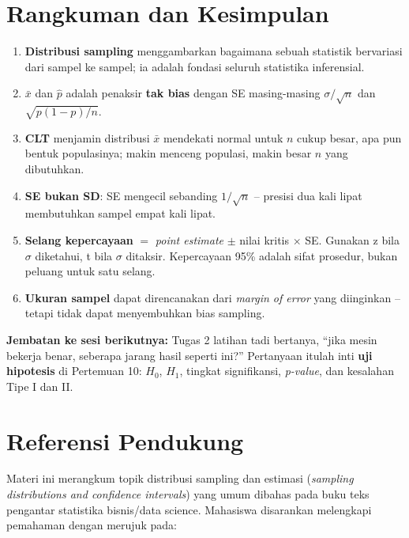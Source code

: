 \documentclass[
  indonesian,
  letterpaper,
]{book}
\providecommand{\tightlist}{%
  \setlength{\itemsep}{0pt}\setlength{\parskip}{0pt}}
\begin{document}

\chapter{Rangkuman dan Kesimpulan}\label{rangkuman-dan-kesimpulan}

\begin{enumerate}
\def\labelenumi{\arabic{enumi}.}
\tightlist
\item
  \textbf{Distribusi sampling} menggambarkan bagaimana sebuah statistik
  bervariasi dari sampel ke sampel; ia adalah fondasi seluruh statistika
  inferensial.
\item
  \(\bar{x}\) dan \(\hat{p}\) adalah penaksir \textbf{tak bias} dengan
  SE masing-masing \(\sigma/\sqrt{n}\) dan \(\sqrt{p(1 - p)/n}\).
\item
  \textbf{CLT} menjamin distribusi \(\bar{x}\) mendekati normal untuk
  \(n\) cukup besar, apa pun bentuk populasinya; makin menceng populasi,
  makin besar \(n\) yang dibutuhkan.
\item
  \textbf{SE bukan SD}: SE mengecil sebanding \(1/\sqrt{n}\) -- presisi
  dua kali lipat membutuhkan sampel empat kali lipat.
\item
  \textbf{Selang kepercayaan} \(=\) \emph{point estimate} \(\pm\) nilai
  kritis \(\times\) SE. Gunakan z bila \(\sigma\) diketahui, t bila
  \(\sigma\) ditaksir. Kepercayaan 95\% adalah sifat prosedur, bukan
  peluang untuk satu selang.
\item
  \textbf{Ukuran sampel} dapat direncanakan dari \emph{margin of error}
  yang diinginkan -- tetapi tidak dapat menyembuhkan bias sampling.
\end{enumerate}

\textbf{Jembatan ke sesi berikutnya:} Tugas 2 latihan tadi bertanya,
``jika mesin bekerja benar, seberapa jarang hasil seperti ini?''
Pertanyaan itulah inti \textbf{uji hipotesis} di Pertemuan 10: \(H_0\),
\(H_1\), tingkat signifikansi, \emph{p-value}, dan kesalahan Tipe I dan
II.


\chapter{Referensi Pendukung}\label{referensi-pendukung}

Materi ini merangkum topik distribusi sampling dan estimasi
(\emph{sampling distributions and confidence intervals}) yang umum
dibahas pada buku teks pengantar statistika bisnis/data science.
Mahasiswa disarankan melengkapi pemahaman dengan merujuk pada:
\end{document}
